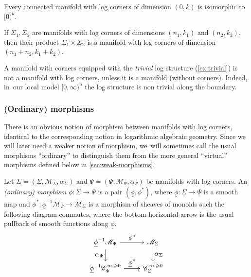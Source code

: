 \documentclass[JEP,XML,SOM,Unicode,NoFloatCountersInSection,published]{cedram}
\let\tst\textstyle
\theoremstyle{definition}
\theoremstyle{remark}
\newenvironment{example}
  {\pushQED{\qed}\renewcommand{\qedsymbol}{$\lozenge$}\examplex}
  {\popQED\endexamplex}
\newenvironment{remark}
  {\pushQED{\qed}\renewcommand{\qedsymbol}{$\lozenge$}\remarkx}
  {\popQED\endremarkx}
\let\defn\emph
\newcommand{\halfspc}[1]{[0,\infty)^{#1}}
\renewcommand{\ge}{\geqslant}
\newcommand{\cM}{\mathscr{M}}
\newcommand{\Cinfge}[1]{\mathscr{C}^{\infty, \ge 0}_{#1}}
\newcommand{\Sig}{\Sigma}
\newcommand{\uSig}{\underline{\Sigma}}
\newcommand{\uPsi}{\underline{\Psi}}
\begin{document}
\begin{example}
Every connected manifold with log corners of dimension $(0,k)$ is isomorphic to $[0)^k$.
\end{example}

\begin{example}
If $\Sig_1,\Sig_2$ are manifolds with log corners of dimensions $(n_1,k_1)$ and $(n_2,k_2)$, then their product $\Sig_1\times\Sig_2$ is a manifold with log corners of dimension $(n_1+n_2,k_1+k_2)$.
\end{example}

\begin{remark}
A manifold with corners equipped with the \emph{trivial} log structure (\autoref{ex:trivial}) is not a manifold with log corners, unless it is a manifold (\ie without corners). Indeed, in~our local model $\halfspc{n}$ the log structure is non trivial along the boundary.
\end{remark}

\subsubsection{(Ordinary) morphisms}

There is an obvious notion of morphism between manifolds with log corners, identical to the corresponding notion in logarithmic algebraic geometry. Since we will later need a weaker notion of morphism, we~will sometimes call the usual morphisms ``ordinary'' to distinguish them from the more general ``virtual'' morphisms defined below in \autoref{sec:weak-morphisms}.

\begin{definition}\label{def:morph}
Let $\Sig = (\uSig,\cM_\Sig,\alpha_\Sig)$ and $\Psi = (\uPsi,\cM_\Psi,\alpha_\Psi)$ be manifolds with log corners. An \defn{(ordinary) morphism} $\phi\colon \Sig \to \Psi$ is a pair $(\underline{\phi},\phi^*)$, where $\underline{\phi}\colon \uSig \to \uPsi$ is a smooth map and $\phi^* \colon \underline{\phi}^{-1}\cM_{\Psi} \to \cM_\Sig$ is a morphism of sheaves of monoids such the following diagram commutes, where the bottom horizontal arrow is the usual pullback of smooth functions along $\underline{\phi}$.
\begin{equation}\label{eq:ordinary-commutativity}
\begin{tikzcd}
\underline{\phi}^{-1}\cM_{\Psi} \ar[r,"\tst \phi^*"]\ar[d,"\tst \alpha_\Psi"'] & \cM_{\Sig} \ar[d,"\tst \alpha_\Sig"] \\
\underline{\phi}^{-1}\Cinfge{\Psi} \ar[r,"\tst \underline{\phi}^*"] \ar[r] & \Cinfge{\Sig}
\end{tikzcd}
\end{equation}
\end{definition}
\end{document}
